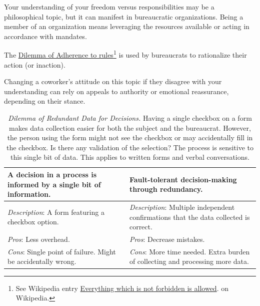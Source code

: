 Your understanding of your freedom versus responsibilities may be a philosophical topic, but it can manifest in bureaucratic organizations. Being a member of an organization means leveraging the resources available or acting in accordance with mandates. 


The \hyperref[table:dilemma-personal-rule-adherence]{Dilemma of Adherence to rules}\footnote{See Wikipedia entry \href{https://en.wikipedia.org/wiki/Everything_which_is_not_forbidden_is_allowed}{Everything which is not forbidden is allowed}. 
on Wikipedia.} is used by bureaucrats to rationalize their action (or inaction). 

Changing a coworker's attitude on this topic if they disagree with your understanding can rely on appeals to authority or emotional reassurance, depending on their stance.


\begin{center}
\begin{table}[H] %
\begin{tabular}{ | m{\dilemmatablewidth}| m{\dilemmatablewidth} | } 
  \hline
  \textbf{A decision in a process is informed by a single bit of information.} & 
  \textbf{Fault-tolerant decision-making through redundancy.} \\ 
  \hline
  \textit{Description}: A form featuring a checkbox option. & 
  \textit{Description}: Multiple independent confirmations that the data collected is correct.  \\
  \hline
  \textit{Pros}: Less overhead. & 
  \textit{Pros}: Decrease mistakes. \\
  \hline
  \textit{Cons}: Single point of failure. Might be accidentally wrong. &
  \textit{Cons}: More time needed. Extra burden of collecting and processing more data. \\  
  \hline
\end{tabular}
\caption{
\textit{Dilemma of Redundant Data for Decisions.}
Having a single checkbox on a form makes data collection easier for both the subject and the bureaucrat. However, the person using the form might not see the checkbox or may accidentally fill in the checkbox. Is there any validation of the selection? The process is sensitive to this single bit of data. This applies to written forms and verbal conversations. 
}
\label{table:dilemma-personal-single-bit-decision}
\end{table}
\end{center}

